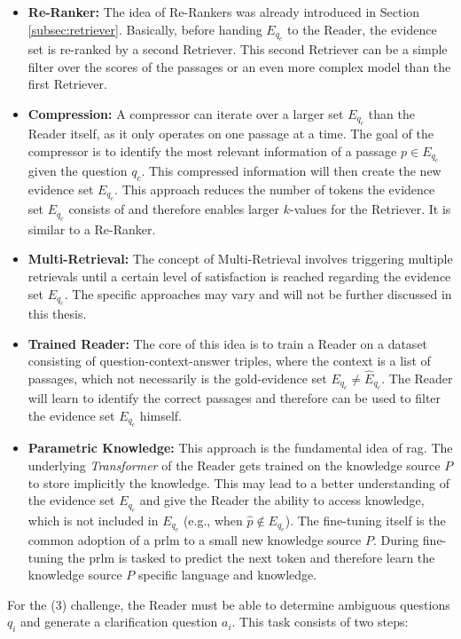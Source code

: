 \begin{itemize}
    \item \textbf{Re-Ranker:} The idea of Re-Rankers was already introduced in Section \ref{subsec:retriever}. Basically, before handing $E_{q_c}$ to the Reader, the evidence set is re-ranked by a second Retriever. This second Retriever can be a simple filter over the scores of the passages or an even more complex model than the first Retriever.
    \item \textbf{Compression:} A compressor can iterate over a larger set $E_{q_c}$ than the Reader itself, as it only operates on one passage at a time. The goal of the compressor is to identify the most relevant information of a passage $p \in E_{q_c}$ given the question $q_c$. This compressed information will then create the new evidence set $E_{q_c}$. This approach reduces the number of tokens the evidence set $E_{q_c}$ consists of and therefore enables larger $k$-values for the Retriever. It is similar to a Re-Ranker.
    \item \textbf{Multi-Retrieval:} The concept of Multi-Retrieval involves triggering multiple retrievals until a certain level of satisfaction is reached regarding the evidence set $E_{q_c}$. The specific approaches may vary and will not be further discussed in this thesis.
    \item \textbf{Trained Reader:} The core of this idea is to train a Reader on a dataset consisting of question-context-answer triples, where the context is a list of passages, which not necessarily is the gold-evidence set $E_{q_c} \not= \hat{E}_{q_c}$. The Reader will learn to identify the correct passages and therefore can be used to filter the evidence set $E_{q_c}$ himself. 
    \item \textbf{Parametric Knowledge:} This approach is the fundamental idea of \gls{rag}. The underlying \textit{Transformer} of the Reader gets trained on the knowledge source $P$ to store implicitly the knowledge. This may lead to a better understanding of the evidence set $E_{q_c}$ and give the Reader the ability to access knowledge, which is not included in $E_{q_c}$ (e.g., when $\hat{p} \not\in E_{q_c}$). The fine-tuning itself is the common adoption of a \gls{prlm} to a small new knowledge source $P$. During fine-tuning the \gls{prlm} is tasked to predict the next token and therefore learn the knowledge source $P$ specific language and knowledge.
\end{itemize}

For the (3) challenge, the Reader must be able to determine ambiguous questions $q_{i}$ and generate a clarification question $a_i$. This task consists of two steps:

